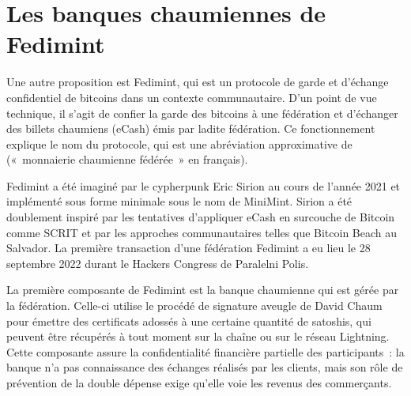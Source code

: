 \section*{Les banques chaumiennes de Fedimint}

Une autre proposition est Fedimint, qui est un protocole de garde et d'échange confidentiel de bitcoins dans un contexte communautaire. D'un point de vue technique, il s'agit de confier la garde des bitcoins à une fédération et d'échanger des billets chaumiens (eCash) émis par ladite fédération. Ce fonctionnement explique le nom du protocole, qui est une abréviation approximative de  («~monnaierie chaumienne fédérée~» en français).

Fedimint a été imaginé par le cypherpunk Eric Sirion au cours de l'année 2021 et implémenté sous forme minimale sous le nom de MiniMint. Sirion a été doublement inspiré par les tentatives d'appliquer eCash en surcouche de Bitcoin comme SCRIT et par les approches communautaires telles que Bitcoin Beach au Salvador. La première transaction d'une fédération Fedimint a eu lieu le 28 septembre 2022 durant le Hackers Congress de Paralelni Polis.


La première composante de Fedimint est la banque chaumienne qui est gérée par la fédération. Celle-ci utilise le procédé de signature aveugle de David Chaum pour émettre des certificats adossés à une certaine quantité de satoshis, qui peuvent être récupérés à tout moment sur la chaîne ou sur le réseau Lightning. Cette composante assure la confidentialité financière partielle des participants~: la banque n'a pas connaissance des échanges réalisés par les clients, mais son rôle de prévention de la double dépense exige qu'elle voie les revenus des commerçants.

